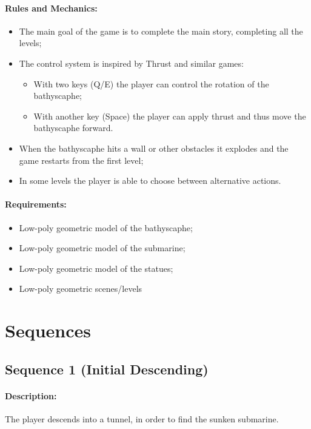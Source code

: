 \documentclass{article}
\begin{document}
\paragraph{Rules and Mechanics: } 
\begin{itemize}
\item The main goal of the game is to complete the main story, completing all the levels;
\item The control system is inspired by Thrust and similar games: 
	\begin{itemize}
	\item With two keys (Q/E) the player can control the rotation of the bathyscaphe;
	\item With another key (Space) the player can apply thrust and thus move the bathyscaphe forward.
	\end{itemize}
\item When the bathyscaphe hits a wall or other obstacles it explodes and the game restarts from the first level;
\item In some levels the player is able to choose between alternative actions.
\end{itemize}

\paragraph{Requirements: } \begin{itemize}
\item Low-poly geometric model of the bathyscaphe;
\item Low-poly geometric model of the submarine;
\item Low-poly geometric model of the statues;
\item Low-poly geometric scenes/levels
\end{itemize}


\section{Sequences}
\subsection{Sequence 1 (Initial Descending)}

\paragraph{Description: } The player descends into a tunnel, in order to find the sunken submarine.
\end{document}
